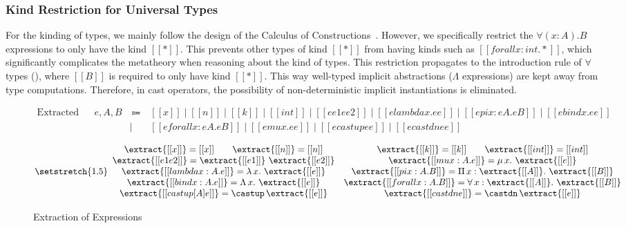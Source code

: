 \subsubsection{Kind Restriction for Universal Types}
\label{sec:kind-restriction}

For the kinding of types, we mainly follow the design of the Calculus of
Constructions~\cite{CoquandThierry1988Tcoc}. However, we specifically restrict
the $\forall (x : A). B$
expressions to only have the kind $[[*]]$. This prevents other types of kind
$[[*]]$ from having kinds such as $[[forall x : int. *]]$,
which significantly complicates the metatheory when reasoning about the kind of types.
This restriction propagates to the introduction rule of $\forall$ types (),
where $[[B]]$ is required to only have kind $[[*]]$.
This way well-typed implicit abstractions ($\Lambda$ expressions) are kept away
from type computations. Therefore, in cast operators,
the possibility of non-deterministic implicit instantiations is eliminated.

\begin{figure}[t]
    \centering
    \begin{equation*}
        \begin{array}{llcl}
            \text{Extracted Expressions} & e, A, B & ~ \Coloneqq ~ & [[x]] \mid [[n]] \mid [[k]] \mid [[int]] \mid [[ee1 ee2]] \mid [[elambda x. ee]] \mid [[epi x : eA. eB]] \mid [[ebind x. ee]] \\
            & & \mid & [[eforall x : eA. eB]] \mid [[emu x. ee]] \mid [[ecastup ee]] \mid [[ecastdn ee]]
        \end{array}
    \end{equation*}

    \begin{equation*}
    {\setstretch{1.5}
    \begin{array}{cc}
        \extract{[[x]]} = [[x]] \qquad
        \extract{[[n]]} = [[n]] &
        \extract{[[k]]} = [[k]] \qquad
        \extract{[[int]]} = [[int]] \\
        \extract{[[e1 e2]]} = \extract{[[e1]]} ~ \extract{[[e2]]} &
        \extract{[[mu x : A. e]]} = \mu \, x. ~ \extract{[[e]]} \\
        \extract{[[lambda x : A. e]]} = \lambda \, x. ~ \extract{[[e]]} &
        \extract{[[pi x : A. B]]} = \Pi \, x : \extract{[[A]]}. ~ \extract{[[B]]} \\
        \extract{[[bind x : A. e]]} = \Lambda \, x. ~ \extract{[[e]]} &
        \extract{[[forall x : A. B]]} = \forall \, x : \extract{[[A]]}. ~ \extract{[[B]]} \\
        \extract{[[castup [A] e]]} = \castup \, \extract{[[e]]} &
        \extract{[[castdn e]]} = \castdn \, \extract{[[e]]}
    \end{array}
    }
    \end{equation*}

    \caption{Extraction of Expressions}
    \label{fig:extraction}
\end{figure}

